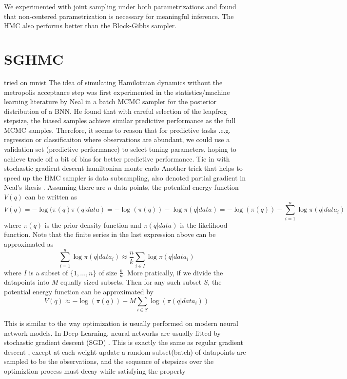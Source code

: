 \documentclass[]{report}
\begin{document}
We experimented with joint sampling under both parametrizations and found that non-centered parametrization is necessary for meaningful inference. The HMC also performs better than the Block-Gibbs sampler.

\section{SGHMC}
tried on mnist
The idea of simulating Hamilotnian dynamics without the metropolis acceptance step was first experimented in the statistics/machine learning literature by Neal \cite{neal1993bayesian} in a batch MCMC sampler for the posterior distribution of a BNN. He found that with careful selection of the leapfrog stepsize, the biased samples achieve similar predictive performance as the full MCMC samples. Therefore, it seems to reason that for predictive tasks .e.g. regression or classificaiton where observations are abundant, we could 
use a validation set (predictive performance) to select tuning parameters, hoping to achieve trade off a bit of bias for better predictive performance. 
Tie in with stochastic gradient descent hamiltonian monte carlo
Another trick that helps to speed up the HMC sampler is data subsampling, also denoted partial gradient in Neal's thesis \cite{neal2012bayesian}.
Assuming there are $n$ data points, the potential energy function $V(q)$ can be written as 
\[ V(q) = -\log( \pi(q) \pi(q|data) = -\log(\pi(q)) -\log \pi(q|data) = -\log(\pi(q)) - \sum_{i=1}^n \log \pi(q|data_i) \]
where $\pi(q)$ is the prior density function and $\pi(q|data)$ is the likelihood function. Note that the finite series in the last expression above can be approximated as 
\[ \sum_{i=1}^n \log \pi(q|data_i) \approx \frac{n}{k} \sum_{i \in I} \log \pi(q|data_i) \]
where $I$ is a subset of $\{1,\dots, n\}$ of size $\frac{k}{n}$. 
More pratically, if we divide the datapoints into $M$ equally sized subsets. Then for any such subset $S$, the potential energy function can be approximated by 
\[ V(q) \approx    -\log(\pi(q)) + M \sum_{i \in S} \log(\pi(q|data_i)) \]

This is similar to the way optimization is usually performed on modern neural network models. 
In Deep Learning, neural networks are usually fitted by stochastic gradient descent (SGD) \cite{ngiam2011optimization}.
This is exactly the same as regular gradient descent \cite{wright1999numerical}, except at each weight update a random subset(batch) of datapoints are sampled to be the  observations, and the sequence of stepsizes over the optimiztion process must decay while satisfying the property
\end{document}
